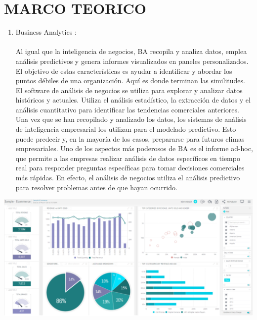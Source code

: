 \section{MARCO TEORICO} 
		
\begin{enumerate}[1.]
	\item Business Analytics :
\\
\\
Al igual que la inteligencia de negocios, BA recopila y analiza datos, emplea análisis predictivos y genera informes visualizados en paneles personalizados. El objetivo de estas características es ayudar a identificar y abordar los puntos débiles de una organización. Aquí es donde terminan las similitudes. El software de análisis de negocios se utiliza para explorar y analizar datos históricos y actuales. Utiliza el análisis estadístico, la extracción de datos y el análisis cuantitativo para identificar las tendencias comerciales anteriores.
\\
Una vez que se han recopilado y analizado los datos, los sistemas de análisis de inteligencia empresarial los utilizan para el modelado predictivo. Esto puede predecir y, en la mayoría de los casos, prepararse para futuros climas empresariales. Uno de los aspectos más poderosos de BA es el informe ad-hoc, que permite a las empresas realizar análisis de datos específicos en tiempo real para responder preguntas específicas para tomar decisiones comerciales más rápidas. En efecto, el análisis de negocios utiliza el análisis predictivo para resolver problemas antes de que hayan ocurrido.

\end{enumerate}

\begin{center}
\includegraphics[scale=0.55]{./Imagenes/BA.png}
\end{center}

